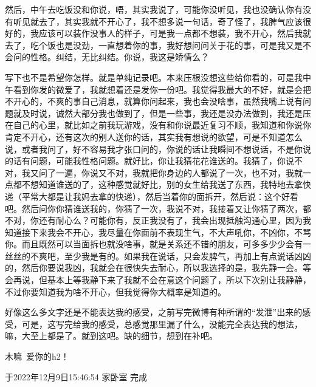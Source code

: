 \documentclass[12pt]{ctexart}
\begin{document}
\par 然后，中午去吃饭没和你说，唔，其实我说了，可能你没听见，我也没确认你有没有听见就去了，其实我就不开心了，我不想多说一句话，奇了怪了，我脾气应该很好的，我应该可以装作没事人的样子，可是我一点都不想装，我不开心，然后我就去了，吃个饭也是没劲，一直想着你的事，我好想问问关于花的事，可是我又是不会问的性格。纠结，无比纠结。你说，我这是矫情么？
\par 写下也不是希望你怎样。就是单纯记录吧。本来压根没想这些给你看的，可是我中午看到你发的微爱了，我就想着还是发你一份吧。我觉得我最大的不好，就是会把不开心的，不爽的事自己消息，就算你问起来，我也会没啥事，虽然我嘴上说有问题就及时说，诚然大部分我也做到了，但是一些事，我还是没办法做到，我还是压在自己的心里，就比如之前我玩游戏，没有和你说最近复习不顺，我知道和你说你肯定不开心，还有这次的别人送你的话，其实我有想说的欲望，可是不知道怎么说，或者我问了，好不容易我才张口问的，你说的话让我瞬间不想说话，不是你说的话有问题，可能我性格问题。就好比，你让我猜花花谁送的。我猜了，你说不对，我又问了一遍，你说又不对，我就把你身边的人都说了一次，也不对，我就一点都不想知道谁送的了，这种感觉就好比，别的女生给我送了东西，我特地去拿快递（平常大都是让我妈去拿的快递），然后当着你的面拆开，然后说：这个好看吧。然后问你你猜谁送我的，你猜了一次，我说不对，我接着又让你猜了两次，都不对，你还有耐心么？可能你有，反正我没有了，我会出现抵触沟通心里，因为我知道接下来我会不开心，我尽量在你面前不表现生气，不大声吼你，不凶你，不骂你。而且既然可以当面拆也就没啥事，就是关系还不错的朋友，可多多少少会有一丝丝的不爽吧，至少我是有的。如果我在说话，只会发脾气，再加上有点说话凶凶的，然后你要说我凶，我就会在很快失去耐心，所以我选择的是，我先静一会。等会再说，但基本上等我静下来了我就不会在意这个问题了，所以下次别让我静静，不过你要知道我为啥不开心，但我觉得你大概率是知道的。
\par 好像这么多文字还是不能表达我的感受，之前写完微博有种所谓的“发泄”出来的感受，可是，这写完给我的感受，总感觉那里漏了什么，没能完全表达我的想法，嘛，大至上都是了。就到这吧。缺的细节，想到在补吧。
\par 木嘛~爱你的h2！
\par 于2022年12月9日15:46:54 家卧室 完成
\end{document}
